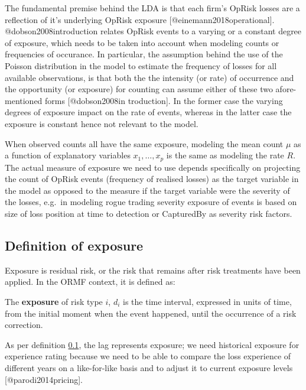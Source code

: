 \documentclass[]{article}
\begin{document}
The fundamental premise behind the LDA is that each firm's OpRisk losses
are a reflection of it's underlying OpRisk exposure
{[}@einemann2018operational{]}. @dobson2008introduction relates OpRisk
events to a varying or a constant degree of exposure, which needs to be
taken into account when modeling counts or frequencies of occurance. In
particular, the assumption behind the use of the Poisson distribution in
the model to estimate the frequency of losses for all available
observations, is that both the the intensity (or rate) of occurrence and
the opportunity (or exposure) for counting can assume either of these
two afore-mentioned forms {[}@dobson2008in troduction{]}. In the former
case the varying degrees of exposure impact on the rate of events,
whereas in the latter case the exposure is constant hence not relevant
to the model.\medskip

When observed counts all have the same exposure, modeling the mean count
\(\mu\) as a function of explanatory variables \(x_{1},\ldots,x_{p}\) is
the same as modeling the rate \(R\). The actual measure of exposure we
need to use depends specifically on projecting the count of OpRisk
events (frequency of realised losses) as the target variable in the
model as opposed to the measure if the target variable were the severity
of the losses, e.g.~in modeling rogue trading severity exposure of
events is based on size of loss position at time to detection or
CapturedBy as severity risk factors.

\subsection{Definition of exposure}
\label{ssec:Definition of exposure}

Exposure is residual risk, or the risk that remains after risk
treatments have been applied. In the ORMF context, it is defined as:

\begin{definition}
The  \textbf{exposure} of risk type $i$, $d_{i}$ is the time interval, expressed in units of time, from the initial moment when the event happened, until the occurrence of a risk correction.
\end{definition}

As per definition \ref{ssec:Definition of exposure}, the lag represents
exposure; we need historical exposure for experience rating because we
need to be able to compare the loss experience of different years on a
like-for-like basis and to adjust it to current exposure levels
{[}@parodi2014pricing{]}.
\end{document}
